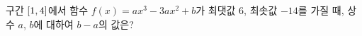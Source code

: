 구간 $[1{,}\mkern3mu\mathopen{}4]$에서 함수 $f(x)=ax^3-3ax^2+b$가 최댓값 $6$, 최솟값 $-14$를 가질 때, 상수 $a$, $b$에 대하여 $b-a$의 값은? 
